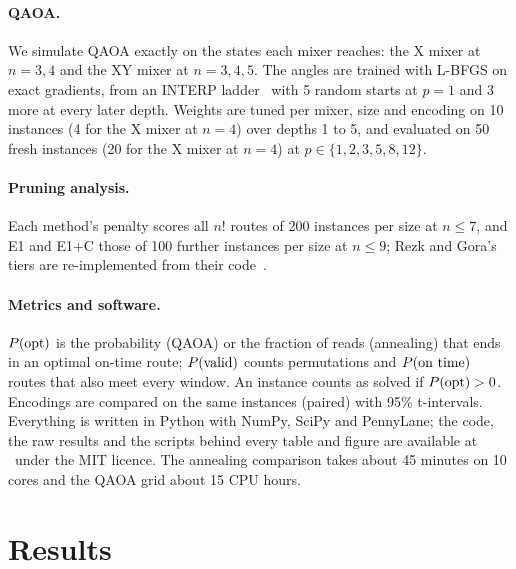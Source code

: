 \paragraph{QAOA.}
We simulate QAOA exactly on the states each mixer reaches: the X mixer at $n=3,4$ and the XY
mixer at $n=3,4,5$. The angles are trained with L-BFGS on exact gradients, from an INTERP
ladder~\cite{zhou2020qaoa} with 5 random starts at $p=1$ and 3 more at every later depth.
Weights are tuned per mixer, size and encoding on 10 instances (4 for the X mixer at $n=4$)
over depths 1 to 5, and evaluated on 50 fresh instances (20 for the X mixer at $n=4$) at
$p \in \{1,2,3,5,8,12\}$.

\paragraph{Pruning analysis.}
Each method's penalty scores all $n!$ routes of 200 instances per size at $n\le7$, and E1 and
E1+C those of 100 further instances per size at $n\le9$; Rezk and Gora's tiers are re-implemented
from their code~\cite{rezk2026code}.

\paragraph{Metrics and software.}
$P(\mathrm{opt})$ is the probability (QAOA) or the fraction of reads (annealing) that ends in an optimal
on-time route; $P(\mathrm{valid})$ counts permutations and $P(\text{on time})$ routes that also meet every window.
An instance counts as solved if $P(\mathrm{opt})>0$. Encodings are compared on the same instances (paired)
with 95\% t-intervals. Everything is written in Python with NumPy, SciPy and PennyLane; the code,
the raw results and the scripts behind every table and figure are available at \repourl\ under
the MIT licence. The annealing comparison takes about 45 minutes on 10 cores and the QAOA grid
about 15 CPU hours.

\section{Results}\label{sec:results}

